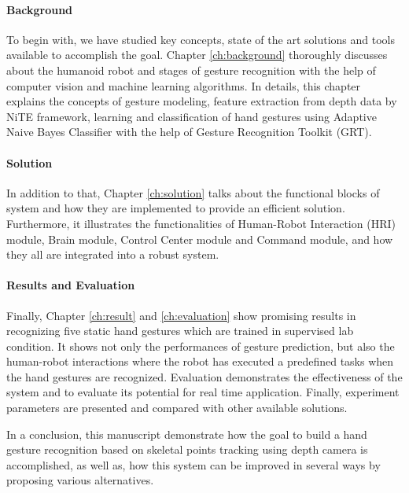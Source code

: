 \paragraph*{Background} To begin with, we have studied key concepts, state of the art solutions and tools available to accomplish the goal. Chapter \ref{ch:background} thoroughly discusses about the humanoid robot and stages of gesture recognition with the help of computer vision and machine learning algorithms. In details, this chapter explains the concepts of gesture modeling, feature extraction from depth data by NiTE framework, learning and classification of hand gestures using Adaptive Naive Bayes Classifier with the help of Gesture Recognition Toolkit (GRT).

\paragraph*{Solution} In addition to that, Chapter \ref{ch:solution} talks about the functional blocks of system and how they are implemented to provide an efficient solution. Furthermore, it illustrates the functionalities of  Human-Robot Interaction (HRI) module, Brain module, Control Center module and Command module, and how they all are integrated into a robust system.

\paragraph*{Results and Evaluation} Finally, Chapter \ref{ch:result} and \ref{ch:evaluation} show promising results in recognizing five static hand gestures which are trained in supervised lab condition. It shows not only the performances of gesture prediction, but also the human-robot interactions where the robot has executed a predefined tasks when the hand gestures are recognized. Evaluation demonstrates the effectiveness of the system and to evaluate its potential for real time application. Finally, experiment parameters are presented and compared with other available solutions.

In a conclusion, this manuscript demonstrate how the goal to build a hand gesture recognition based on skeletal points tracking using depth camera is accomplished, as well as, how this system can be improved in several ways by proposing various alternatives.
